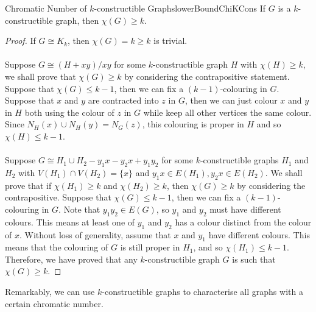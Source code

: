 \documentclass[math]{amznotes}
\theoremstyle{remark}
\newcommand{\0}{\mathbf{0}}
\newcommand{\1}{\mathbf{1}}
\begin{document}
\begin{probox}{Chromatic Number of $k$-constructible Graphs}{lowerBoundChiKCons}
    If $G$ is a $k$-constructible graph, then $\chi(G) \geq k$.
    \tcblower
    \begin{proof}
        If $G \cong K_k$, then $\chi(G) = k \geq k$ is trivial. 
        \\\\
        Suppose $G \cong (H + xy)/xy$ for some $k$-constructible graph $H$ with $\chi(H) \geq k$, we shall prove that $\chi(G) \geq k$ by considering the contrapositive statement. Suppose that $\chi(G) \leq k - 1$, then we can fix a $(k - 1)$-colouring in $G$. Suppose that $x$ and $y$ are contracted into $z$ in $G$, then we can just colour $x$ and $y$ in $H$ both using the colour of $z$ in $G$ while keep all other vertices the same colour. Since $N_H(x) \cup N_H(y) = N_G(z)$, this colouring is proper in $H$ and so $\chi(H) \leq k - 1$. 
        \\\\
        Suppose $G \cong H_1 \cup H_2 - y_1x - y_2x + y_1y_2$ for some $k$-constructible graphs $H_1$ and $H_2$ with $V(H_1) \cap V(H_2) = \{x\}$ and $y_1x \in E(H_1), y_2x \in E(H_2)$. We shall prove that if $\chi(H_1) \geq k$ and $\chi(H_2) \geq k$, then $\chi(G) \geq k$ by considering the contrapositive. Suppose that $\chi(G) \leq k - 1$, then we can fix a $(k - 1)$-colouring in $G$. Note that $y_1y_2 \in E(G)$, so $y_1$ and $y_2$ must have different colours. This means at least one of $y_1$ and $y_2$ has a colour distinct from the colour of $x$. Without loss of generality, assume that $x$ and $y_1$ have different colours. This means that the colouring of $G$ is still proper in $H_1$, and so $\chi(H_1) \leq k - 1$. Therefore, we have proved that any $k$-constructible graph $G$ is such that $\chi(G) \geq k$.
    \end{proof}
\end{probox}
Remarkably, we can use $k$-constructible graphs to characterise all graphs with a certain chromatic number.
\end{document}

